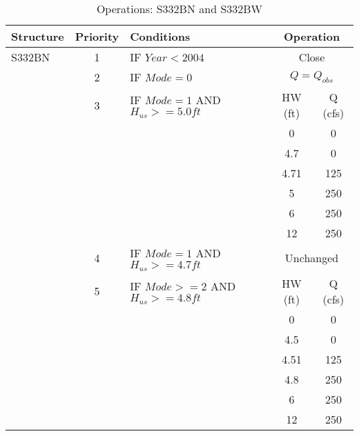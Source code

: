 \scriptsize
\begin{table}[!h]
\centering
\caption{Operations: S332BN and S332BW}
\label{tab:M11opsS332BNBW}
\begin{tabular}{|l|c|l|c|c|}
\hline
\textbf{Structure} & \textbf{Priority}  & \textbf{Conditions} & \multicolumn{2}{|c|}{\textbf{Operation}}   \\
\hline
\hline
S332BN        &  1  & IF $Year<2004$                               & \multicolumn{2}{|c|}{Close}   \\
\hline
              &  2  & IF $Mode=0$                                  & \multicolumn{2}{|c|}{$Q = Q_{obs}$}   \\
\hline
              &  3  & IF $Mode=1$ AND $H_{us}>=5.0ft$              & HW (ft) & Q (cfs)  \\
              &     &                                              & 0    &  0   \\
              &     &                                              & 4.7  &  0 \\
              &     &                                              & 4.71 &  125 \\
              &     &                                              & 5    &  250 \\
              &     &                                              & 6    &  250 \\
              &     &                                              & 12   &  250 \\
\hline
              &  4  & IF $Mode=1$ AND $H_{us}>=4.7ft$              & \multicolumn{2}{|c|}{Unchanged}   \\
\hline
              &  5  & IF $Mode>=2$ AND $H_{us}>=4.8ft$             & HW (ft) & Q (cfs)  \\
              &     &                                              & 0    &  0   \\
              &     &                                              & 4.5  &  0 \\
              &     &                                              & 4.51 &  125 \\
              &     &                                              & 4.8  &  250 \\
              &     &                                              & 6    &  250 \\
              &     &                                              & 12   &  250 \\

\end{tabular}
\end{table}
